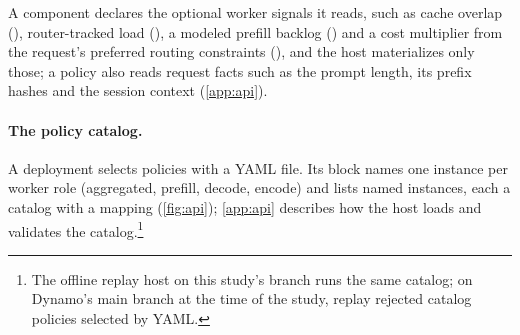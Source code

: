 A component declares the optional worker signals it reads, such as cache overlap (),
router-tracked load (), a modeled prefill backlog () and a cost
multiplier from the request's preferred routing constraints (), and the host
materializes only those; a policy also reads request facts such as the prompt length, its prefix
hashes and the session context (\cref{app:api}).

\paragraph{The policy catalog.}
A deployment selects policies with a YAML file. Its  block names one
instance per worker role (aggregated, prefill, decode, encode) and lists named instances, each a
catalog  with a  mapping (\cref{fig:api}); \cref{app:api} describes how
the host loads and validates the catalog.\footnote{The offline replay host on this study's branch
  runs the same catalog; on Dynamo's main branch at the time of the study, replay rejected catalog
  policies selected by YAML.}

